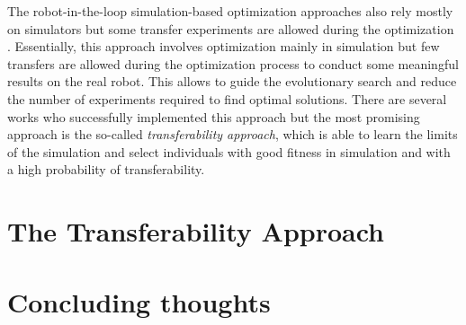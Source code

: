 The robot-in-the-loop simulation-based optimization approaches also rely mostly on simulators but some transfer experiments are allowed during the optimization \cite{inproceedings}. Essentially, this approach involves optimization mainly in simulation but few transfers are allowed during the optimization process to conduct some meaningful results on the real robot. This allows to guide the evolutionary search and reduce the number of experiments required to find optimal solutions. There are several works who successfully implemented this approach \cite{bongard2006resilient} \cite{koos2009automatic} but the most promising approach is the so-called \emph{transferability approach}, which is able to learn the limits of the simulation and select individuals with good fitness in simulation and with a high probability of transferability.

\section{The Transferability Approach}

\section{Concluding thoughts}
